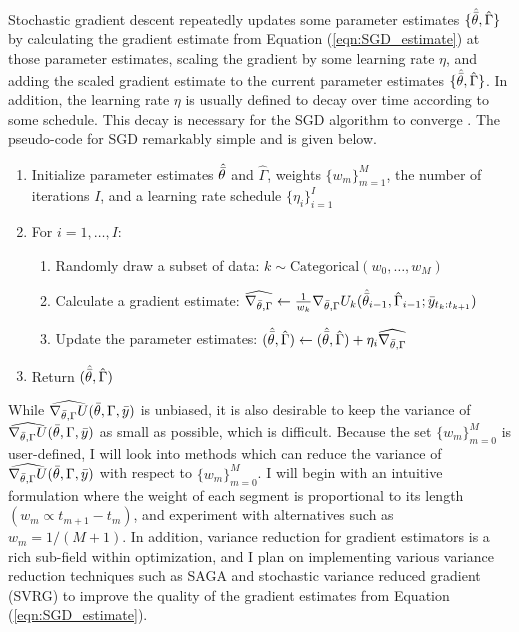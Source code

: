 Stochastic gradient descent repeatedly updates some parameter estimates $\{\hat {\bar{\theta}}, \hat \Gamma\}$ by calculating the gradient estimate from Equation (\ref{eqn:SGD_estimate}) at those parameter estimates, scaling the gradient by some learning rate $\eta$, and adding the scaled gradient estimate to the current parameter estimates $\{\hat {\bar{\theta}}, \hat \Gamma\}$. In addition, the learning rate $\eta$ is usually defined to decay over time according to some schedule. This decay is necessary for the SGD algorithm to converge \citep{Robbins:1951}. The pseudo-code for SGD remarkably simple and is given below.

\begin{enumerate}
    \item Initialize parameter estimates $\hat {\bar{\theta}}$ and $\hat \Gamma$, weights $\{w_m\}_{m=1}^M$, the number of iterations $I$, and a learning rate schedule $\{\eta_i\}_{i=1}^I$
    \item For $i = 1,\ldots,I$:
    \begin{enumerate}
        \item Randomly draw a subset of data: $k \sim \text{Categorical}\left(w_0,\ldots,w_M\right)$
        \item Calculate a gradient estimate: $\widehat{\nabla_{\bar{\theta},\Gamma}} \leftarrow \frac{1}{w_k} \nabla_{\bar{\theta},\Gamma} U_k(\hat {\bar{\theta}}_{i-1},\hat \Gamma_{i-1};\bar{y}_{t_k:t_{k+1}})$ 
        \item Update the parameter estimates: $(\hat {\bar{\theta}},\hat \Gamma) \leftarrow (\hat {\bar{\theta}},\hat \Gamma) + \eta_i \widehat{\nabla_{\bar{\theta},\Gamma}}$
    \end{enumerate}
    \item Return $(\hat {\bar{\theta}},\hat \Gamma)$
\end{enumerate}
%
While $\widehat{\nabla_{\bar{\theta},\Gamma} U}(\bar{\theta},\Gamma,\bar{y})$ is unbiased, it is also desirable to keep the variance of $\widehat{\nabla_{\bar{\theta},\Gamma} U}(\bar{\theta},\Gamma,\bar{y})$ as small as possible, which is difficult. Because the set $\{w_m\}_{m=0}^M$ is user-defined, I will look into methods which can reduce the variance of $\widehat{\nabla_{\bar{\theta},\Gamma} U}(\bar{\theta},\Gamma,\bar{y})$ with respect to $\{w_m\}_{m=0}^{M}$. I will begin with an intuitive formulation where the weight of each segment is proportional to its length $\left(w_m \propto t_{m+1}-t_m\right)$, and experiment with alternatives such as $w_m = 1/(M+1)$.
In addition, variance reduction for gradient estimators is a rich sub-field within optimization, and I plan on implementing various variance reduction techniques such as SAGA \citep{Defazio:2014} and stochastic variance reduced gradient (SVRG) \citep{Johnson:2013} to improve the quality of the gradient estimates from Equation (\ref{eqn:SGD_estimate}).

